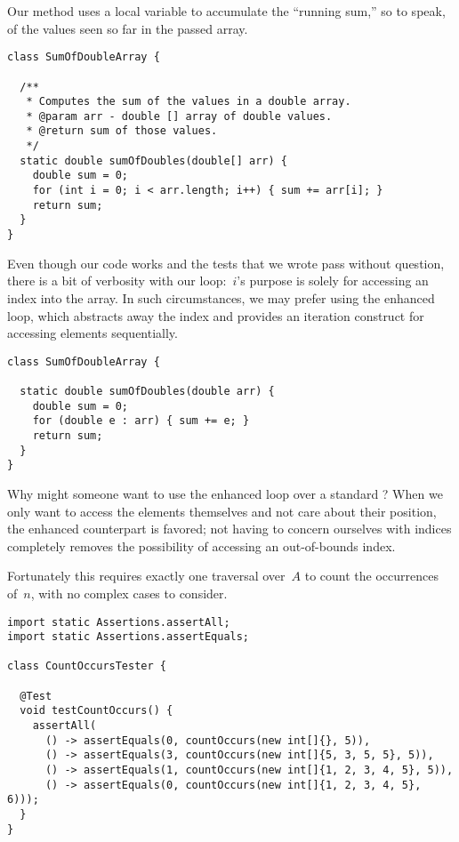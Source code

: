 Our method uses a local variable to accumulate the ``running sum,'' so to speak, of the values seen so far in the passed array.

\begin{lstlisting}[language=MyJava]
class SumOfDoubleArray {

  /**
   * Computes the sum of the values in a double array.
   * @param arr - double [] array of double values.
   * @return sum of those values.
   */
  static double sumOfDoubles(double[] arr) {
    double sum = 0;
    for (int i = 0; i < arr.length; i++) { sum += arr[i]; }
    return sum;
  }
}
\end{lstlisting}

Even though our code works and the tests that we wrote pass without question, there is a bit of verbosity with our loop:~$i$'s purpose is solely for accessing an index into the array. 
In such circumstances, we may prefer using the enhanced  loop, which abstracts away the index and provides an iteration construct for accessing elements sequentially.

\begin{lstlisting}[language=MyJava]
class SumOfDoubleArray {

  static double sumOfDoubles(double arr) {
    double sum = 0;
    for (double e : arr) { sum += e; }
    return sum;
  }
}
\end{lstlisting}

Why might someone want to use the enhanced  loop over a standard ? 
When we only want to access the elements themselves and not care about their position, the enhanced counterpart is favored; not having to concern ourselves with indices completely removes the possibility of accessing an out-of-bounds index. 

Fortunately this requires exactly one traversal over~$A$ to count the occurrences of~$n$, with no complex cases to consider.

\begin{lstlisting}[language=MyJava]
import static Assertions.assertAll;
import static Assertions.assertEquals;

class CountOccursTester {

  @Test
  void testCountOccurs() {
    assertAll(
      () -> assertEquals(0, countOccurs(new int[]{}, 5)),
      () -> assertEquals(3, countOccurs(new int[]{5, 3, 5, 5}, 5)),
      () -> assertEquals(1, countOccurs(new int[]{1, 2, 3, 4, 5}, 5)),
      () -> assertEquals(0, countOccurs(new int[]{1, 2, 3, 4, 5}, 6)));
  }
}
\end{lstlisting}

